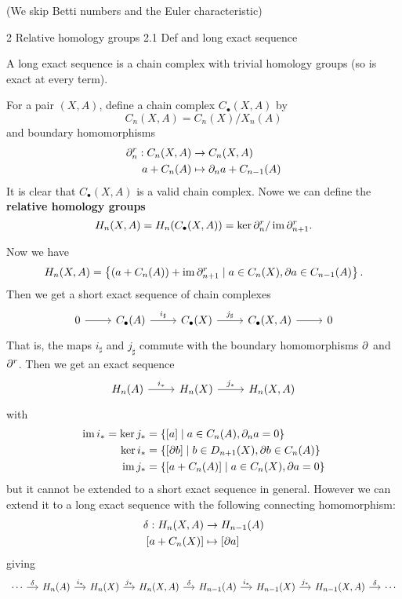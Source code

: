 (We skip Betti numbers and the Euler characteristic)

2 Relative homology groups
2.1 Def and long exact sequence

\begin{defn}
  A long exact sequence is a chain complex with trivial homology groups (so is exact at every term).
\end{defn}

\begin{defn}
  For a pair $(X,A)$, define a chain complex $C_\bullet(X,A)$ by
  \[C_n(X,A) = C_n(X)/X_n(A)\]
  and boundary homomorphisms
  \begin{align*}
    \partial_n^r: C_n(X,A) &\to C_n(X,A) \\
    a + C_n(A) &\mapsto \partial_na + C_{n-1}(A)
  \end{align*}
  It is clear that $C_\bullet(X,A)$ is a valid chain complex.
  Nowe we can define the \textbf{relative homology groups}
  \[H_n(X,A) = H_n(C_\bullet(X,A)) = \ker\partial_n^r/\operatorname{im}\partial_{n+1}^r.\]
\end{defn}

Now we have
\[H_n(X,A) = \left\{ (a + C_n(A)) + \operatorname{im}\partial_{n+1}^r \mid a \in C_n(X), \partial a \in C_{n-1}(A) \right\}.\]
Then we get a short exact sequence of chain complexes
\begin{equation*}
  \begin{tikzcd}
    0 \ar[r] & C_\bullet(A) \ar[r, "i_\sharp"] & C_\bullet(X) \ar[r, "j_\sharp"] & C_\bullet(X,A) \ar[r] & 0
  \end{tikzcd}
\end{equation*}
That is, the maps $i_\sharp$ and $j_\sharp$ commute with the boundary homomorphisms $\partial$ and $\partial^r$.
Then we get an exact sequence
\begin{equation*}
  \begin{tikzcd}
    H_n(A) \ar[r, "i_*"] & H_n(X) \ar[r, "j_*"] & H_n(X,A)
  \end{tikzcd}
\end{equation*}
with
\begin{align*}
  \operatorname{im} i_* = \ker j_* &= \{ [a] \mid a \in C_n(A), \partial_n a = 0 \} \\
  \ker i_* &= \{ [\partial b] \mid b \in D_{n+1}(X), \partial b \in C_n(A) \} \\
  \operatorname{im} j_* &= \{ [a + C_n(A)] \mid a \in C_n(X), \partial a=0 \}
\end{align*}
but it cannot be extended to a short exact sequence in general.
However we can extend it to a long exact sequence with the following connecting homomorphism:
\begin{align*}
  \delta: H_n(X,A) &\to H_{n-1}(A) \\
  [a + C_n(X)] &\mapsto [\partial a]
\end{align*}
giving
\begin{equation*}
  \begin{tikzcd}[column sep=small]
    \cdots \ar[r, "\delta"] & H_n(A) \ar[r, "i_*"] & H_n(X) \ar[r, "j_*"] & H_n(X,A) \ar[r, "\delta"] & H_{n-1}(A) \ar[r, "i_*"] & H_{n-1}(X) \ar[r, "j_*"] & H_{n-1}(X,A) \ar[r, "\delta"] & \cdots
  \end{tikzcd}
\end{equation*}

